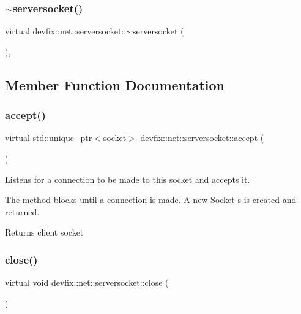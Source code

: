 \subsubsection{\texorpdfstring{$\sim$serversocket()}{~serversocket()}}
{\footnotesize\ttfamily virtual devfix\+::net\+::serversocket\+::$\sim$serversocket (\begin{DoxyParamCaption}{ }\end{DoxyParamCaption})\hspace{0.3cm}{\ttfamily [virtual]}, {\ttfamily [default]}}



\subsection{Member Function Documentation}
\mbox{\label{structdevfix_1_1net_1_1serversocket_a7b3ea6aad486060acdd1385a08f7db81}} 
\subsubsection{\texorpdfstring{accept()}{accept()}}
{\footnotesize\ttfamily virtual std\+::unique\+\_\+ptr$<$\hyperlink{structdevfix_1_1net_1_1socket}{socket}$>$ devfix\+::net\+::serversocket\+::accept (\begin{DoxyParamCaption}{ }\end{DoxyParamCaption})\hspace{0.3cm}{\ttfamily [pure virtual]}}



Listens for a connection to be made to this socket and accepts it. 

The method blocks until a connection is made. A new Socket s is created and returned. \begin{DoxyReturn}{Returns}
client socket 
\end{DoxyReturn}
\mbox{\label{structdevfix_1_1net_1_1serversocket_ab1762c3364c8298dbac6c3dd67a1e7aa}} 
\subsubsection{\texorpdfstring{close()}{close()}}
{\footnotesize\ttfamily virtual void devfix\+::net\+::serversocket\+::close (\begin{DoxyParamCaption}{ }\end{DoxyParamCaption})\hspace{0.3cm}{\ttfamily [pure virtual]}}



